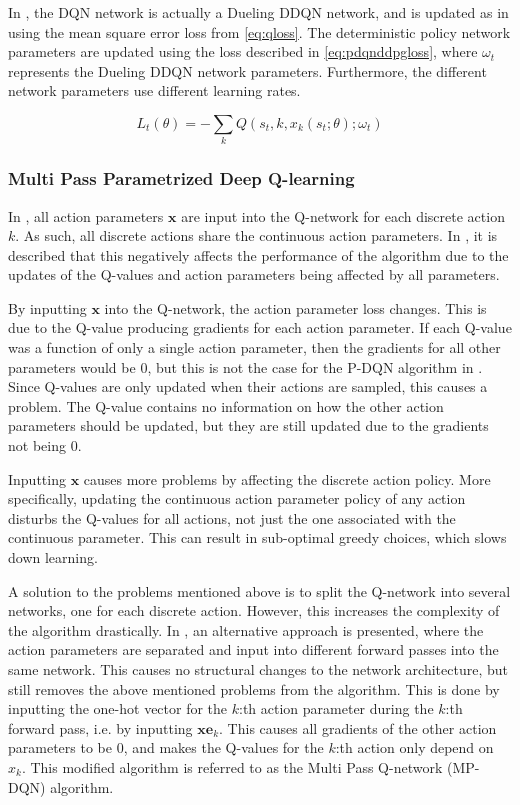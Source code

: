 \documentclass{kththesis}
\begin{document}
In \parencite{xiong2018parametrized}, the DQN network is actually a Dueling DDQN network, and is updated as in \parencite{mnih2015human} using the mean square error loss from \autoref{eq:qloss}. The deterministic policy network parameters are updated using the loss described in \autoref{eq:pdqnddpgloss}, where $\omega_t$ represents the Dueling DDQN network parameters. Furthermore, the different network parameters use different learning rates.

\begin{equation}
\label{eq:pdqnddpgloss}
L_t(\theta) = -\sum_kQ(s_t, k, x_k(s_t;\theta);\omega_t)
\end{equation}

\subsubsection{Multi Pass Parametrized Deep Q-learning}
In \parencite{xiong2018parametrized}, all action parameters $\boldsymbol{x}$ are input into the Q-network for each discrete action $k$. As such, all discrete actions share the continuous action parameters. In \parencite{bester2019mpdqn}, it is described that this negatively affects the performance of the algorithm due to the updates of the Q-values and action parameters being affected by all parameters. 

By inputting $\boldsymbol{x}$ into the Q-network, the action parameter loss changes. This is due to the Q-value producing gradients for each action parameter. If each Q-value was a function of only a single action parameter, then the gradients for all other parameters would be $0$, but this is not the case for the P-DQN algorithm in \parencite{xiong2018parametrized}. Since Q-values are only updated when their actions are sampled, this causes a problem. The Q-value contains no information on how the other action parameters should be updated, but they are still updated due to the gradients not being $0$. 

Inputting $\boldsymbol{x}$ causes more problems by affecting the discrete action policy. More specifically, updating the continuous action parameter policy of any action disturbs the Q-values for all actions, not just the one associated with the continuous parameter. This can result in sub-optimal greedy choices, which slows down learning. \parencite{bester2019mpdqn}

A solution to the problems mentioned above is to split the Q-network into several networks, one for each discrete action. However, this increases the complexity of the algorithm drastically. In \parencite{bester2019mpdqn}, an alternative approach is presented, where the action parameters are separated and input into different forward passes into the same network. This causes no structural changes to the network architecture, but still removes the above mentioned problems from the algorithm. This is done by inputting the one-hot vector for the $k$:th action parameter during the $k$:th forward pass, i.e. by inputting $\boldsymbol{x}\boldsymbol{e}_k$. This causes all gradients of the other action parameters to be $0$, and makes the Q-values for the $k$:th action only depend on $x_k$. This modified algorithm is referred to as the Multi Pass Q-network (MP-DQN) algorithm. \parencite{bester2019mpdqn}
\end{document}
